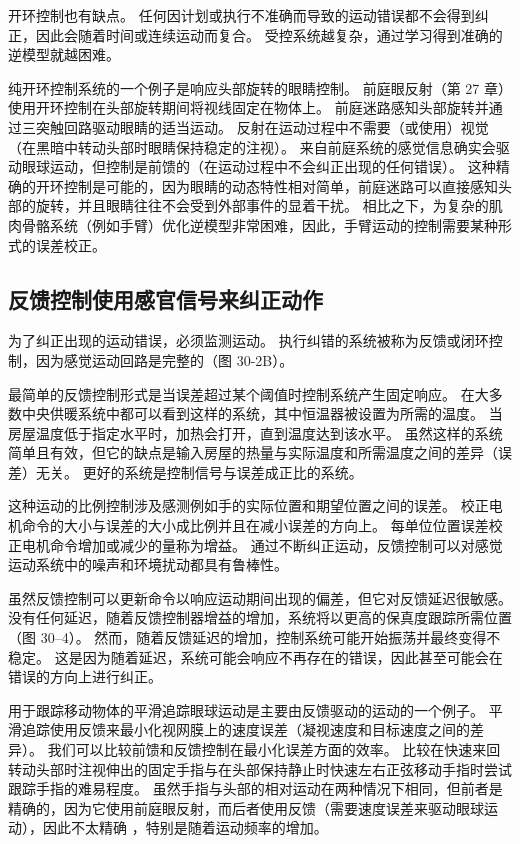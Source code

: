 开环控制也有缺点。 任何因计划或执行不准确而导致的运动错误都不会得到纠正，因此会随着时间或连续运动而复合。 受控系统越复杂，通过学习得到准确的逆模型就越困难。

纯开环控制系统的一个例子是响应头部旋转的眼睛控制。 前庭眼反射（第 27 章）使用开环控制在头部旋转期间将视线固定在物体上。 前庭迷路感知头部旋转并通过三突触回路驱动眼睛的适当运动。 反射在运动过程中不需要（或使用）视觉（在黑暗中转动头部时眼睛保持稳定的注视）。 来自前庭系统的感觉信息确实会驱动眼球运动，但控制是前馈的（在运动过程中不会纠正出现的任何错误）。 这种精确的开环控制是可能的，因为眼睛的动态特性相对简单，前庭迷路可以直接感知头部的旋转，并且眼睛往往不会受到外部事件的显着干扰。 相比之下，为复杂的肌肉骨骼系统（例如手臂）优化逆模型非常困难，因此，手臂运动的控制需要某种形式的误差校正。


\subsection{反馈控制使用感官信号来纠正动作}

为了纠正出现的运动错误，必须监测运动。 执行纠错的系统被称为反馈或闭环控制，因为感觉运动回路是完整的（图 30-2B）。

最简单的反馈控制形式是当误差超过某个阈值时控制系统产生固定响应。 在大多数中央供暖系统中都可以看到这样的系统，其中恒温器被设置为所需的温度。 当房屋温度低于指定水平时，加热会打开，直到温度达到该水平。 虽然这样的系统简单且有效，但它的缺点是输入房屋的热量与实际温度和所需温度之间的差异（误差）无关。 更好的系统是控制信号与误差成正比的系统。

这种运动的比例控制涉及感测例如手的实际位置和期望位置之间的误差。 校正电机命令的大小与误差的大小成比例并且在减小误差的方向上。 每单位位置误差校正电机命令增加或减少的量称为增益。 通过不断纠正运动，反馈控制可以对感觉运动系统中的噪声和环境扰动都具有鲁棒性。

虽然反馈控制可以更新命令以响应运动期间出现的偏差，但它对反馈延迟很敏感。 没有任何延迟，随着反馈控制器增益的增加，系统将以更高的保真度跟踪所需位置（图 30–4）。 然而，随着反馈延迟的增加，控制系统可能开始振荡并最终变得不稳定。 这是因为随着延迟，系统可能会响应不再存在的错误，因此甚至可能会在错误的方向上进行纠正。

用于跟踪移动物体的平滑追踪眼球运动是主要由反馈驱动的运动的一个例子。 平滑追踪使用反馈来最小化视网膜上的速度误差（凝视速度和目标速度之间的差异）。 我们可以比较前馈和反馈控制在最小化误差方面的效率。 比较在快速来回转动头部时注视伸出的固定手指与在头部保持静止时快速左右正弦移动手指时尝试跟踪手指的难易程度。 虽然手指与头部的相对运动在两种情况下相同，但前者是精确的，因为它使用前庭眼反射，而后者使用反馈（需要速度误差来驱动眼球运动），因此不太精确 ，特别是随着运动频率的增加。

